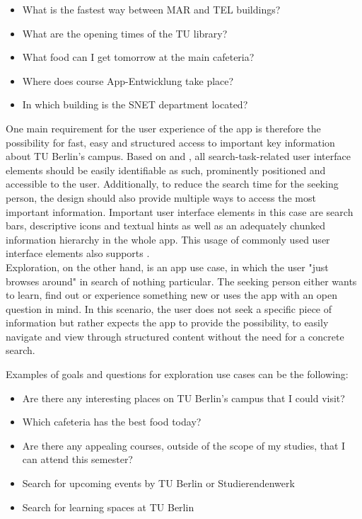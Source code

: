 \begin{itemize}
    \item What is the fastest way between MAR and TEL buildings?
    \item What are the opening times of the TU library?
    \item What food can I get tomorrow at the main cafeteria?
    \item Where does course App-Entwicklung take place?
    \item In which building is the SNET department located?
\end{itemize}

One main requirement for the user experience of the app is therefore the possibility for fast, easy and structured access to important key information about TU Berlin's campus. Based on \cite{fitts_law} and \cite{jakobs_law}, all search-task-related user interface elements should be easily identifiable as such, prominently positioned and accessible to the user. Additionally, to reduce the search time for the seeking person, the design should also provide multiple ways to access the most important information. Important user interface elements in this case are search bars, descriptive icons and textual hints as well as an adequately chunked information hierarchy in the whole app. This usage of commonly used user interface elements also supports \cite{jakobs_law}.\\

Exploration, on the other hand, is an app use case, in which the user "just browses around" in search of nothing particular. The seeking person either wants to learn, find out or experience something new or uses the app with an open question in mind. In this scenario, the user does not seek a specific piece of information but rather expects the app to provide the possibility, to easily navigate and view through structured content without the need for a concrete search.

Examples of goals and questions for exploration use cases can be the following:

\begin{itemize}
    \item Are there any interesting places on TU Berlin's campus that I could visit?
    \item Which cafeteria has the best food today?
    \item Are there any appealing courses, outside of the scope of my studies, that I can attend this semester?
    \item Search for upcoming events by TU Berlin or Studierendenwerk
    \item Search for learning spaces at TU Berlin
\end{itemize}

